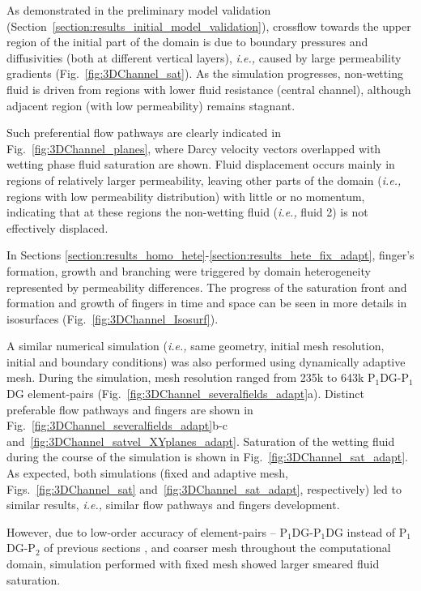 \documentclass[preprint,authoryear,12pt]{elsarticle}
\newcommand{\PN}[2][error]{P$_{#1}$DG-P$_{#2}$}
\newcommand{\PNDG}[2][error]{P$_{#1}$DG-P$_{#2}$DG}
\newcommand{\ie}{{\it i.e., }}
\begin{document}
\medskip
As demonstrated in the preliminary model validation (Section~\ref{section:results_initial_model_validation}), crossflow towards the upper region of the initial part of the domain is due to boundary pressures and diffusivities (both at different vertical layers), \ie caused by large permeability gradients (Fig.~\ref{fig:3DChannel_sat}). As the simulation progresses, non-wetting fluid is driven from regions with lower fluid resistance (central channel), although adjacent region (with low permeability) remains stagnant.

\medskip
Such preferential flow pathways are clearly indicated in Fig.~\ref{fig:3DChannel_planes}, where Darcy velocity vectors overlapped with wetting phase fluid saturation are shown. Fluid displacement occurs mainly in regions of relatively larger permeability, leaving other parts of the domain (\ie regions with low permeability distribution) with little or no momentum, indicating that at these regions the non-wetting fluid (\ie fluid 2) is not effectively displaced. 

\medskip
In Sections \ref{section:results_homo_hete}-\ref{section:results_hete_fix_adapt}, finger's formation, growth and branching were triggered by domain heterogeneity represented by permeability differences. The progress of the saturation front and formation and growth of fingers in time and space can be seen in more details in isosurfaces (Fig.~\ref{fig:3DChannel_Isosurf}).

\medskip
A similar numerical simulation (\ie same geometry, initial mesh resolution, initial and boundary conditions) was also performed using dynamically adaptive mesh. During the simulation, mesh resolution ranged from 235k to 643k \PNDG[1]{1} element-pairs (Fig.~\ref{fig:3DChannel_severalfields_adapt}a). Distinct preferable flow pathways and fingers are shown in Fig.~\ref{fig:3DChannel_severalfields_adapt}b-c and~\ref{fig:3DChannel_satvel_XYplanes_adapt}. Saturation of the wetting fluid during the course of the simulation is shown in Fig.~\ref{fig:3DChannel_sat_adapt}. As expected, both simulations (fixed and adaptive mesh, Figs.~\ref{fig:3DChannel_sat} and~\ref{fig:3DChannel_sat_adapt}, respectively) led to similar results, \ie similar flow pathways and fingers development. 

\medskip
However, due to low-order accuracy of element-pairs -- \PNDG[1]{1} instead of \PN[1]{2} of previous sections \citep[for full investigation on numerical accuracy associated with these element-pairs, see][]{salinas2015,salinas_2016,salinas_2018,adam_2016, gomes_2017}, and coarser mesh throughout the computational domain, simulation performed with fixed mesh showed larger smeared fluid saturation. 
\end{document}
